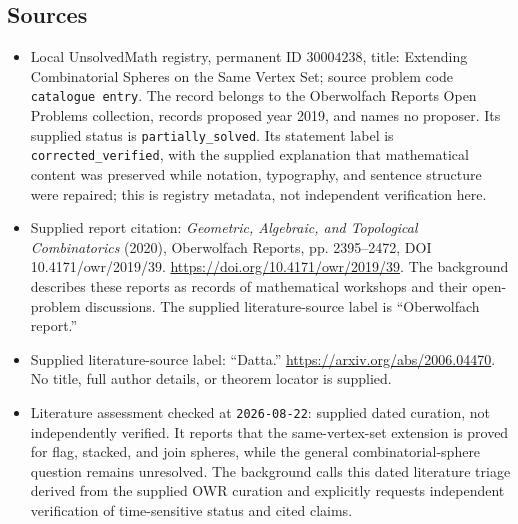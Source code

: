\documentclass[11pt]{article}
\begin{document}
\subsection{Sources}
\begin{itemize}
\item Local UnsolvedMath registry, permanent ID \(30004238\), title: Extending Combinatorial Spheres on the Same Vertex Set; source problem code \texttt{catalogue entry}. The record belongs to the Oberwolfach Reports Open Problems collection, records proposed year 2019, and names no proposer. Its supplied status is \texttt{partially\_solved}. Its statement label is \texttt{corrected\_verified}, with the supplied explanation that mathematical content was preserved while notation, typography, and sentence structure were repaired; this is registry metadata, not independent verification here.
\item Supplied report citation: \emph{Geometric, Algebraic, and Topological Combinatorics} (2020), Oberwolfach Reports, pp. 2395--2472, DOI 10.4171/owr/2019/39. \url{https://doi.org/10.4171/owr/2019/39}. The background describes these reports as records of mathematical workshops and their open-problem discussions. The supplied literature-source label is ``Oberwolfach report.''
\item Supplied literature-source label: ``Datta.'' \url{https://arxiv.org/abs/2006.04470}. No title, full author details, or theorem locator is supplied.
\item Literature assessment checked at \texttt{2026-08-22}: supplied dated curation, not independently verified. It reports that the same-vertex-set extension is proved for flag, stacked, and join spheres, while the general combinatorial-sphere question remains unresolved. The background calls this dated literature triage derived from the supplied OWR curation and explicitly requests independent verification of time-sensitive status and cited claims.
\end{itemize}
\end{document}
